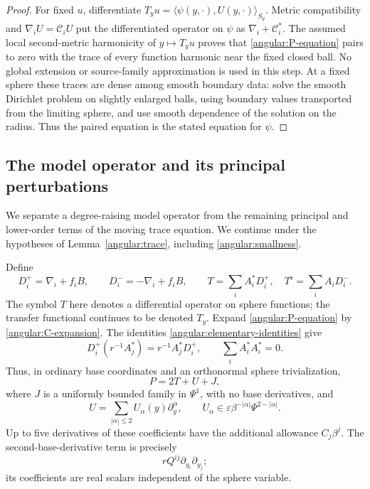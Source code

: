 \documentclass[11pt,a4paper]{article}
\newcommand{\eps}{\varepsilon}
\numberwithin{equation}{section}
\begin{document}
\begin{proof}
For fixed $u$, differentiate
$T_yu=\langle\psi(y,\cdot),U(y,\cdot)\rangle_{S_y}$.
Metric compatibility and $\nabla_iU=\mathcal C_iU$ put the differentiated
operator on $\psi$ as $\nabla_i+\mathcal C_i^*$.
The assumed local second-metric harmonicity of $y\mapsto T_yu$ proves that
\eqref{angular:P-equation} pairs to zero with the trace of every
function harmonic near the fixed closed ball.  No global extension
or source-family approximation is used in this step.
At a fixed sphere these traces are dense among
smooth boundary data: solve the smooth Dirichlet problem on slightly
enlarged balls, using boundary values transported from the limiting sphere,
and use smooth dependence of the solution on the radius.  Thus the paired
equation is the stated equation for $\psi$.
\end{proof}

\subsection{The model operator and its principal perturbations}

We separate a degree-raising model operator from the remaining
principal and lower-order terms of the moving trace equation.  We continue under the hypotheses of
Lemma~\ref{angular:trace}, including \eqref{angular:smallness}.

Define
\begin{equation}\label{angular:T-definition}
 D_i^+=\nabla_i+f_iB,\qquad D_i^-=-\nabla_i+f_iB,
 \qquad
 T=\sum_i A_i^*D_i^+,\quad T^\flat=\sum_i A_iD_i^-.
\end{equation}
The symbol $T$ here denotes a differential operator on sphere functions;
the transfer functional continues to be denoted $T_y$.
Expand \eqref{angular:P-equation} by
\eqref{angular:C-expansion}.  The identities
\eqref{angular:elementary-identities} give
\[
 D_i^+(r^{-1}A_j^*)=r^{-1}A_j^*D_i^+,
 \qquad \sum_iA_i^*A_i^*=0.
\]
Thus, in ordinary base coordinates and an orthonormal sphere
trivialization,
\begin{equation}\label{angular:P-decomposition}
 P=2T+U+J,
\end{equation}
where $J$ is a uniformly bounded family in $\Psi^1$, with no base
derivatives, and
\begin{equation}\label{angular:U-bounds}
 U=\sum_{|\alpha|\le2}U_\alpha(y)\partial_y^\alpha,
 \qquad U_\alpha\in\eps\beta^{-|\alpha|}
                               \Psi^{2-|\alpha|}.
\end{equation}
Up to five derivatives of these coefficients have the additional
allowance $C_j\beta^j$.  The second-base-derivative term is precisely
\begin{equation}\label{angular:real-principal-part}
 rQ^{ij}\partial_{y_i}\partial_{y_j};
\end{equation}
its coefficients are real scalars independent of the sphere variable.
\end{document}
